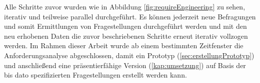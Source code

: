 Alle Schritte zuvor wurden wie in Abbildung \ref{fig:requireEngineering} zu sehen, iterativ und teilweise parallel durchgeführt.
Es können jederzeit neue Befragungen und somit Ermittlungen von Fragestellungen durchgeführt werden und mit den neu erhobenen Daten die zuvor beschriebenen Schritte erneut iterativ vollzogen werden.
Im Rahmen dieser Arbeit wurde ab einem bestimmten Zeitfenster die Anforderungsanalyse abgeschlossen, damit ein Prototyp (\ref{sec:erstellungPrototyp}) und anschließend eine präsentierfähige Version (\ref{kap:umsetzung}) auf Basis der bis dato spezifizierten Fragestellungen erstellt werden kann.